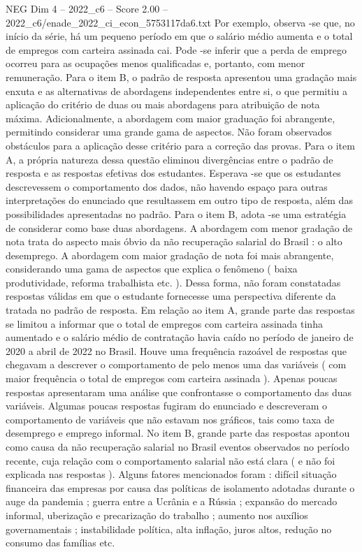 \begin{textsample}{NEG Dim 4 – 2022\_c6 – Score 2.00 – 2022\_c6/enade\_2022\_ci\_econ\_5753117da6.txt}
Por exemplo, observa -se que, no início da série, há um pequeno período em que o salário médio aumenta e o total de empregos com carteira assinada cai.
Pode -se inferir que a perda de emprego ocorreu para as ocupações menos qualificadas e, portanto, com menor remuneração.
Para o item B, o padrão de resposta apresentou uma gradação mais enxuta e as alternativas de abordagens independentes entre si, o que permitiu a aplicação do critério de duas ou mais abordagens para atribuição de nota máxima.
Adicionalmente, a abordagem com maior graduação foi abrangente, permitindo considerar uma grande gama de aspectos.
Não foram observados obstáculos para a aplicação desse critério para a correção das provas.
Para o item A, a própria natureza dessa questão eliminou divergências entre o padrão de resposta e as respostas efetivas dos estudantes.
Esperava -se que os estudantes descrevessem o comportamento dos dados, não havendo espaço para outras interpretações do enunciado que resultassem em outro tipo de resposta, além das possibilidades apresentadas no padrão.
Para o item B, adota -se uma estratégia de considerar como base duas abordagens.
A abordagem com menor gradação de nota trata do aspecto mais óbvio da não recuperação salarial do Brasil : o alto desemprego.
A abordagem com maior gradação de nota foi mais abrangente, considerando uma gama de aspectos que explica o fenômeno ( baixa produtividade, reforma trabalhista etc. ).
Dessa forma, não foram constatadas respostas válidas em que o estudante fornecesse uma perspectiva diferente da tratada no padrão de resposta.
Em relação ao item A, grande parte das respostas se limitou a informar que o total de empregos com carteira assinada tinha aumentado e o salário médio de contratação havia caído no período de janeiro de 2020 a abril de 2022 no Brasil.
Houve uma frequência razoável de respostas que chegavam a descrever o comportamento de pelo menos uma das variáveis ( com maior frequência o total de empregos com carteira assinada ).
Apenas poucas respostas apresentaram uma análise que confrontasse o comportamento das duas variáveis.
Algumas poucas respostas fugiram do enunciado e descreveram o comportamento de variáveis que não estavam nos gráficos, tais como taxa de desemprego e emprego informal.
No item B, grande parte das respostas apontou como causa da não recuperação salarial no Brasil eventos observados no período recente, cuja relação com o comportamento salarial não está clara ( e não foi explicada nas respostas ).
Alguns fatores mencionados foram : difícil situação financeira das empresas por causa das políticas de isolamento adotadas durante o auge da pandemia ; guerra entre a Ucrânia e a Rússia ; expansão do mercado informal, uberização e precarização do trabalho ; aumento nos auxílios governamentais ; instabilidade política, alta inflação, juros altos, redução no consumo das famílias etc.

\end{textsample}

